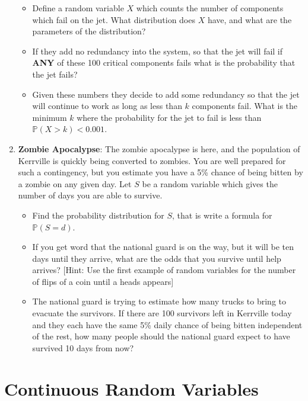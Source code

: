 \documentclass[
]{book}
\providecommand{\tightlist}{%
  \setlength{\itemsep}{0pt}\setlength{\parskip}{0pt}}
\newcommand{\prob}[1]{{\mathbb{P}(#1)}}
\theoremstyle{definition}
\theoremstyle{definition}
\theoremstyle{definition}
\theoremstyle{definition}
\theoremstyle{remark}
\begin{document}
\begin{enumerate}
  \begin{itemize}
  \tightlist
  \item
    Define a random variable \(X\) which counts the number of components which fail on the jet. What distribution does \(X\) have, and what are the parameters of the distribution?
  \item
    If they add no redundancy into the system, so that the jet will fail if \textbf{ANY} of these 100 critical components fails what is the probability that the jet fails?
  \item
    Given these numbers they decide to add some redundancy so that the jet will continue to work as long as less than \(k\) components fail. What is the minimum \(k\) where the probability for the jet to fail is less than \(\prob{X>k}< 0.001\).
  \end{itemize}
\item
  \textbf{Zombie Apocalypse}: The zombie apocalypse is here, and the population of Kerrville is quickly being converted to zombies. You are well prepared for such a contingency, but you estimate you have a 5\% chance of being bitten by a zombie on any given day. Let \(S\) be a random variable which gives the number of days you are able to survive.

  \begin{itemize}
  \tightlist
  \item
    Find the probability distribution for \(S\), that is write a formula for \(\prob{S=d}\).
  \item
    If you get word that the national guard is on the way, but it will be ten days until they arrive, what are the odds that you survive until help arrives? {[}Hint: Use the first example of random variables for the number of flips of a coin until a heads appears{]}
  \item
    The national guard is trying to estimate how many trucks to bring to evacuate the survivors. If there are 100 survivors left in Kerrville today and they each have the same 5\% daily chance of being bitten independent of the rest, how many people should the national guard expect to have survived 10 days from now?
  \end{itemize}
\end{enumerate}

\hypertarget{continuous-random-variables}{%
\chapter{Continuous Random Variables}\label{continuous-random-variables}}
\end{document}
